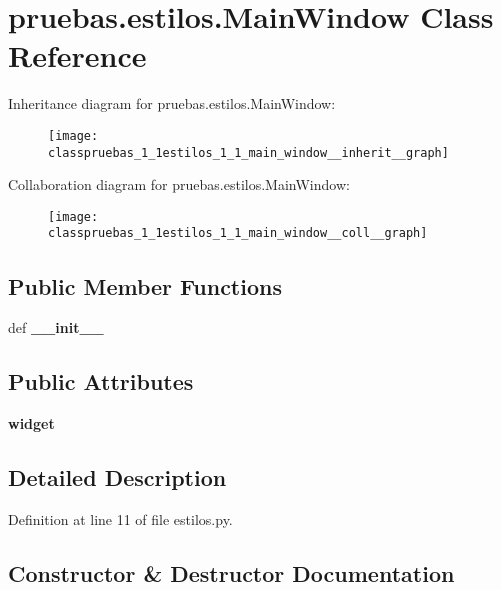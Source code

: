 \section{pruebas.\-estilos.\-Main\-Window \-Class \-Reference}
\label{classpruebas_1_1estilos_1_1_main_window}


\-Inheritance diagram for pruebas.\-estilos.\-Main\-Window\-:\nopagebreak
\begin{figure}[H]
\begin{center}
\leavevmode
\texttt{[image: classpruebas\_1\_1estilos\_1\_1\_main\_window\_\_inherit\_\_graph]}
\end{center}
\end{figure}


\-Collaboration diagram for pruebas.\-estilos.\-Main\-Window\-:\nopagebreak
\begin{figure}[H]
\begin{center}
\leavevmode
\texttt{[image: classpruebas\_1\_1estilos\_1\_1\_main\_window\_\_coll\_\_graph]}
\end{center}
\end{figure}
\subsection*{\-Public \-Member \-Functions}
\begin{DoxyCompactItemize}
\item 
def {\bf \-\_\-\-\_\-init\-\_\-\-\_\-}
\end{DoxyCompactItemize}
\subsection*{\-Public \-Attributes}
\begin{DoxyCompactItemize}
\item 
{\bf widget}
\end{DoxyCompactItemize}


\subsection{\-Detailed \-Description}


\-Definition at line 11 of file estilos.\-py.



\subsection{\-Constructor \& \-Destructor \-Documentation}
